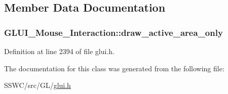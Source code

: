 \subsection{Member Data Documentation}
\hypertarget{class_g_l_u_i___mouse___interaction_a1ac48da74085fbff71aab99f2e51b280}{
\subsubsection[{draw\+\_\+active\+\_\+area\+\_\+only}]{ G\+L\+U\+I\+\_\+\+Mouse\+\_\+\+Interaction\+::draw\+\_\+active\+\_\+area\+\_\+only}}\label{class_g_l_u_i___mouse___interaction_a1ac48da74085fbff71aab99f2e51b280}


Definition at line 2394 of file glui.\+h.



The documentation for this class was generated from the following file\+:\begin{DoxyCompactItemize}
\item 
S\+S\+W\+C/src/\+G\+L/\hyperlink{glui_8h}{glui.\+h}\end{DoxyCompactItemize}
